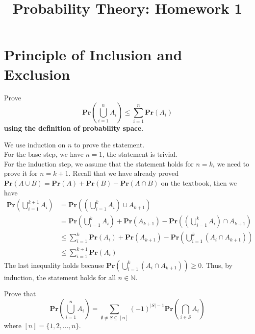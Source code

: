 \documentclass[a4paper, justified]{tufte-handout}
\title{Probability Theory: Homework 1}
\date{\zhtoday} %
\begin{document}
\maketitle

\section{Principle of Inclusion and Exclusion}

\begin{problem}
  Prove \[
\mathbf{Pr}\left( \bigcup_{i=1}^{n} A_i \right) \le \sum_{i=1}^{n} \mathbf{Pr}\left(A_i\right)
\] \textbf{using the definition of probability space}. 
\end{problem}

\begin{solution}
  We use induction on $n$ to prove the statement.\\
  For the base step, we have $n = 1$, the statement is trivial. \\
  For the induction step, we assume that the statement holds for $n = k$, we need to prove it for $n = k + 1$. Recall that we have already proved $\mathbf{Pr}\left(A \cup B\right) = \mathbf{Pr}\left(A\right) + \mathbf{Pr}\left(B\right) - \mathbf{Pr}\left(A \cap B\right)$ on the textbook, then we have
  \[\begin{aligned}
    \mathbf{Pr}\left( \bigcup_{i=1}^{k+1} A_i \right) &= \mathbf{Pr}\left( \left(\bigcup_{i=1}^{k} A_i\right) \cup A_{k+1} \right)\\
    &= \mathbf{Pr}\left( \bigcup_{i=1}^{k} A_i \right) + \mathbf{Pr}\left( A_{k+1} \right) - \mathbf{Pr}\left( \left(\bigcup_{i=1}^{k} A_i\right) \cap A_{k+1} \right)\\
    &\le \sum_{i=1}^{k} \mathbf{Pr}\left(A_i\right) + \mathbf{Pr}\left( A_{k+1} \right) - \mathbf{Pr}\left( \bigcup_{i=1}^{k} \left(A_i \cap A_{k+1}\right) \right)\\
    &\le \sum_{i=1}^{k+1} \mathbf{Pr}\left(A_i\right)
  \end{aligned}
  \]
  The last inequality holds because $\mathbf{Pr}\left( \bigcup_{i=1}^{k} \left(A_i \cap A_{k+1}\right) \right) \ge 0$. Thus, by induction, the statement holds for all $n \in \mathbb{N}$.
\end{solution}

\begin{problem}
  Prove that \[\mathbf{Pr}\left( \bigcup_{i=1}^n A_i\right) = \sum_{\emptyset \neq S \subseteq [n]} (-1)^{|S|-1} \mathbf{Pr}\left( \bigcap_{i \in S} A_i \right)\]
  where $[n]=\{1,2,\ldots,n\}$.
\end{problem}
\end{document}
